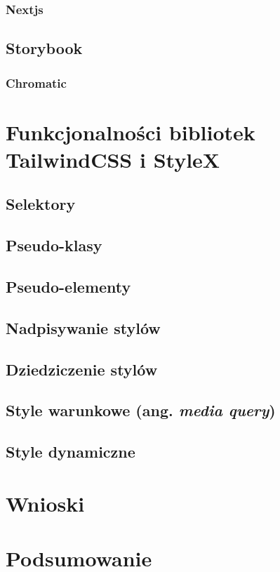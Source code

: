 \documentclass[a4paper,12pt]{book} %
\begin{document}
\subsection{Nextjs}
\section{Storybook}
\subsection{Chromatic}

\chapter{Funkcjonalności bibliotek TailwindCSS i StyleX}
\section{Selektory}
\section{Pseudo-klasy}
\section{Pseudo-elementy}
\section{Nadpisywanie stylów}
\section{Dziedziczenie stylów}
\section{Style warunkowe (ang. \emph{media query})}
\section{Style dynamiczne}

\chapter{Wnioski}

\chapter*{Podsumowanie}





\end{document}
